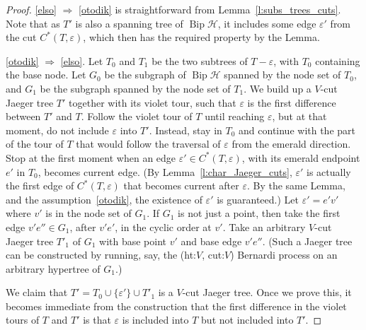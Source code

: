 \documentclass[ALCO,ThmDefs,Unicode,epreuves]{cedram}
\newcommand{\HH}{\mathcal H}
\DeclareMathOperator{\bip}{Bip}
\begin{document}
\begin{proof}
 \ref{elso} $\Rightarrow$ \ref{otodik} is straightforward from Lemma~\ref{l:subs_trees_cuts}. Note that as $T'$ is also a spanning tree of $\bip \HH$, it includes some edge $\varepsilon'$ from the cut $C^*(T,\varepsilon)$, which then has the required property by the Lemma. 


\ref{otodik} $\Rightarrow$ \ref{elso}. Let $T_0$ and $T_1$ be the two subtrees of $T-\varepsilon$, with $T_0$ containing the base node. Let $G_0$ be the subgraph of $\bip\HH$ spanned by the node set of $T_0$, and $G_1$ be the subgraph spanned by the node set of $T_1$. We build up a $V$-cut Jaeger tree $T'$ together with its violet tour, such that $\varepsilon$ is the first difference between $T'$ and $T$. Follow the violet tour of $T$ until reaching $\varepsilon$, but at that moment, do not include $\varepsilon$ into $T'$. Instead, stay in $T_0$ and continue with the part of the tour of $T$ that would follow the traversal of $\varepsilon$ from the emerald direction. Stop at the first moment when an edge $\varepsilon' \in C^*(T,\varepsilon)$, with its emerald endpoint $e'$ in $T_0$, becomes current edge. (By Lemma~\ref{l:char_Jaeger_cuts}, $\varepsilon'$ is actually the first edge of $C^*(T,\varepsilon)$ that becomes current after $\varepsilon$. By the same Lemma, and the assumption~\ref{otodik}, the existence of $\varepsilon'$ is guaranteed.) Let $\varepsilon'=e'v'$ where $v'$ is in the node set of $G_1$. If $G_1$ is not just a point, then take the first edge $v'e''\in G_1$, after $v'e'$, in the cyclic order at $v'$. Take an arbitrary $V$-cut Jaeger tree $T'_1$ of $G_1$ with base point $v'$ and base edge $v'e''$. (Such a Jaeger tree can be constructed by running, say, the (ht:$V$, cut:$V$) Bernardi process on an arbitrary hypertree of $G_1$.)

We claim that $T'=T_0\cup\{\varepsilon'\}\cup T'_1$ is a $V$-cut Jaeger tree. Once we prove this, it becomes immediate from the construction that the first difference in the violet tours of $T$ and $T'$ is that $\varepsilon$ is included into $T$ but not included into $T'$.


\end{proof}
\end{document}
